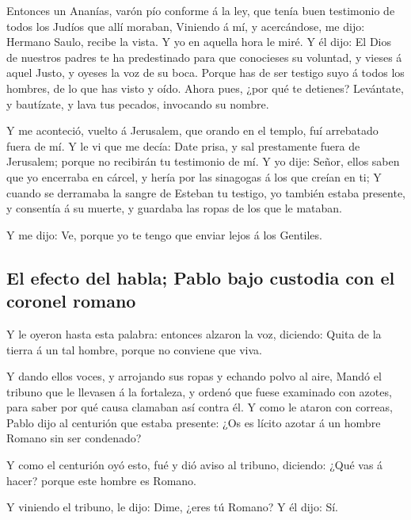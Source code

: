  Entonces un Ananías, varón pío conforme á la ley, que
tenía buen testimonio de todos los Judíos que allí moraban,
 Viniendo á mí, y acercándose, me dijo: Hermano Saulo,
recibe la vista. Y yo en aquella hora le miré.  Y él dijo:
El Dios de nuestros padres te ha predestinado para que conocieses su
voluntad, y vieses á aquel Justo, y oyeses la voz de su boca.
 Porque has de ser testigo suyo á todos los hombres, de lo
que has visto y oído.  Ahora pues, ¿por qué te detienes?
Levántate, y bautízate, y lava tus pecados, invocando su nombre.

 Y me aconteció, vuelto á Jerusalem, que orando en el
templo, fuí arrebatado fuera de mí.  Y le vi que me decía:
Date prisa, y sal prestamente fuera de Jerusalem; porque no recibirán tu
testimonio de mí.  Y yo dije: Señor, ellos saben que yo
encerraba en cárcel, y hería por las sinagogas á los que creían en ti;
 Y cuando se derramaba la sangre de Esteban tu testigo, yo
también estaba presente, y consentía á su muerte, y guardaba las ropas
de los que le mataban.

 Y me dijo: Ve, porque yo te tengo que enviar lejos á los
Gentiles.

\hypertarget{el-efecto-del-habla-pablo-bajo-custodia-con-el-coronel-romano}{%
\subsection{El efecto del habla; Pablo bajo custodia con el coronel
romano}\label{el-efecto-del-habla-pablo-bajo-custodia-con-el-coronel-romano}}

 Y le oyeron hasta esta palabra: entonces alzaron la voz,
diciendo: Quita de la tierra á un tal hombre, porque no conviene que
viva.

 Y dando ellos voces, y arrojando sus ropas y echando polvo
al aire,  Mandó el tribuno que le llevasen á la fortaleza,
y ordenó que fuese examinado con azotes, para saber por qué causa
clamaban así contra él.  Y como le ataron con correas,
Pablo dijo al centurión que estaba presente: ¿Os es lícito azotar á un
hombre Romano sin ser condenado?

 Y como el centurión oyó esto, fué y dió aviso al tribuno,
diciendo: ¿Qué vas á hacer? porque este hombre es Romano.

 Y viniendo el tribuno, le dijo: Dime, ¿eres tú Romano? Y
él dijo: Sí.

